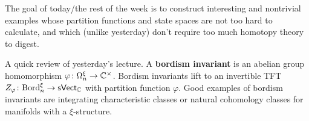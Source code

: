 The goal of today/the rest of the week is to construct interesting and nontrivial examples whose partition functions and state spaces are not too hard to calculate, and which (unlike yesterday) don't require too much homotopy theory to digest.
\orbreak

A quick review of yesterday's lecture. A \textbf{bordism invariant} is an abelian group homomorphism $\varphi  \colon \Omega_n ^{\xi}  \to \mathbb{C}^{\times }$. Bordism invariants lift to an invertible TFT $Z_{\varphi }\colon  \mathrm{Bord}_n ^{\xi} \to \mathsf{sVect} _{\mathbb{C}}$ with partition function $\varphi $. Good examples of bordism invariants are integrating characteristic classes or natural cohomology classes for manifolds with a $\xi$-structure.
